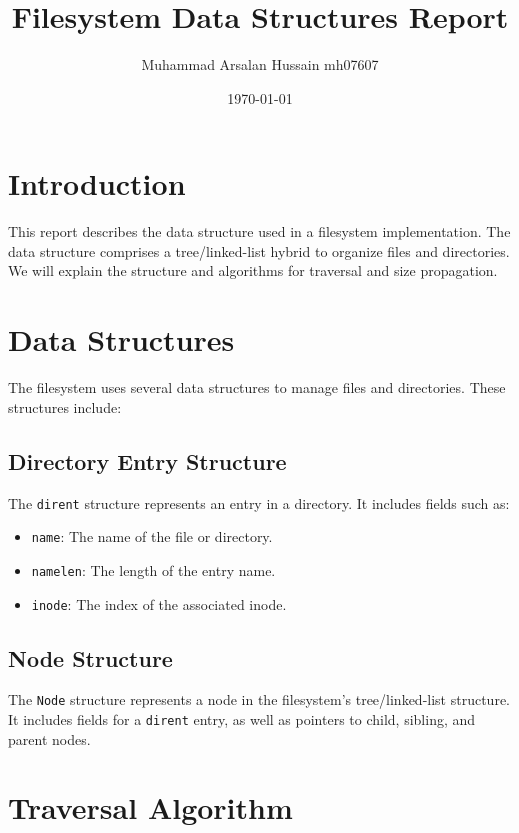 \documentclass{article}
\title{Filesystem Data Structures Report}
\author{Muhammad Arsalan Hussain mh07607}
\date{\today}
\begin{document}
\maketitle

\section{Introduction}

This report describes the data structure used in a filesystem implementation. The data structure comprises a tree/linked-list hybrid to organize files and directories. We will explain the structure and algorithms for traversal and size propagation.

\section{Data Structures}

The filesystem uses several data structures to manage files and directories. These structures include:

\subsection{Directory Entry Structure}

The \texttt{dirent} structure represents an entry in a directory. It includes fields such as:
\begin{itemize}
    \item \texttt{name}: The name of the file or directory.
    \item \texttt{namelen}: The length of the entry name.
    \item \texttt{inode}: The index of the associated inode.
\end{itemize}

\subsection{Node Structure}

The \texttt{Node} structure represents a node in the filesystem's tree/linked-list structure. It includes fields for a \texttt{dirent} entry, as well as pointers to child, sibling, and parent nodes.

\section{Traversal Algorithm}
\end{document}
